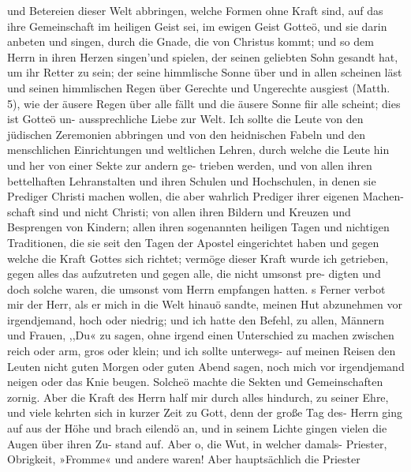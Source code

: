 und Betereien dieser Welt abbringen, welche Formen ohne Kraft
sind, auf das ihre Gemeinschaft im heiligen Geist sei, im ewigen
Geist Gotteö, und sie darin anbeten und singen, durch die Gnade,
die von Christus kommt; und so dem Herrn in ihren Herzen
singen’und spielen, der seinen geliebten Sohn gesandt hat, um
ihr Retter zu sein; der seine himmlische Sonne über und in allen
scheinen läst und seinen himmlischen Regen über Gerechte und
Ungerechte ausgiest (Matth. 5), wie der äusere Regen über alle
fällt und die äusere Sonne fiir alle scheint; dies ist Gotteö un-
aussprechliche Liebe zur Welt. Ich sollte die Leute von den
jüdischen Zeremonien abbringen und von den heidnischen Fabeln
und den menschlichen Einrichtungen und weltlichen Lehren, durch
welche die Leute hin und her von einer Sekte zur andern ge-
trieben werden, und von allen ihren bettelhaften Lehranstalten
und ihren Schulen und Hochschulen, in denen sie Prediger Christi
machen wollen, die aber wahrlich Prediger ihrer eigenen Machen-
schaft sind und nicht Christi; von allen ihren Bildern und Kreuzen
und Besprengen von Kindern; allen ihren sogenannten heiligen
Tagen und nichtigen Traditionen, die sie seit den Tagen der
Apostel eingerichtet haben und gegen welche die Kraft Gottes
sich richtet; vermöge dieser Kraft wurde ich getrieben, gegen
alles das aufzutreten und gegen alle, die nicht umsonst pre-
digten und doch solche waren, die umsonst vom Herrn  empfangen
hatten. s
Ferner verbot mir der Herr, als er mich in die Welt hinauö
sandte, meinen Hut abzunehmen vor irgendjemand, hoch oder
niedrig; und ich hatte den Befehl, zu allen, Männern und Frauen,
,,Du« zu sagen, ohne irgend einen Unterschied zu machen zwischen
reich oder arm, gros oder klein; und ich sollte unterwegs- auf
meinen Reisen den Leuten nicht guten Morgen oder guten Abend
sagen, noch mich vor irgendjemand neigen oder das Knie beugen.
Solcheö machte die Sekten und Gemeinschaften zornig. Aber die
Kraft des Herrn  half mir durch alles hindurch, zu seiner Ehre,
und viele kehrten sich in kurzer Zeit zu Gott, denn der große
Tag des- Herrn  ging auf aus der Höhe und brach eilendö an,
und in seinem Lichte gingen vielen die Augen über ihren Zu-
stand auf.
Aber o, die Wut, in welcher damals- Priester, Obrigkeit,
»Fromme« und andere waren! Aber hauptsächlich die Priester


